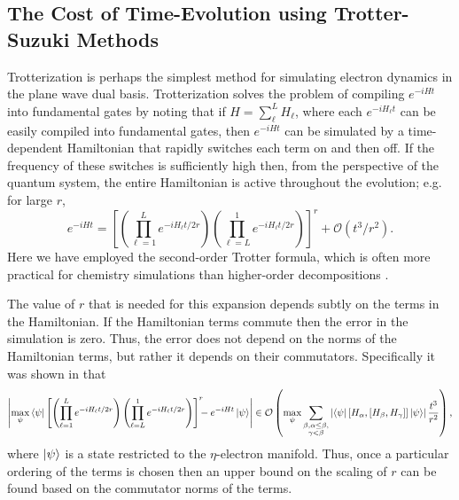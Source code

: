 \documentclass[superscriptaddress,aps,pra,nofootinbib,notitlepage,10pt,longbibliography]{revtex4-1}
\def\bra#1{\mathinner{\langle{#1}|}}
\def\ket#1{\mathinner{|{#1}\rangle}}
\begin{document}
\subsection{The Cost of Time-Evolution using Trotter-Suzuki Methods}
\label{sec:trotter_alg}

Trotterization is perhaps the simplest method for simulating electron dynamics in the plane wave dual basis. Trotterization solves the problem of compiling $e^{-iHt}$ into fundamental gates by noting that if $H=\sum_\ell^L H_\ell$, where each $e^{-iH_\ell t}$ can be easily compiled into fundamental gates, then $e^{-iHt}$ can be simulated by a time-dependent Hamiltonian that rapidly switches each term on and then off.  If the frequency of these switches is sufficiently high then, from the perspective of the quantum system, the entire Hamiltonian is active throughout the evolution; e.g. for large $r$,
\begin{equation}
e^{-iHt}= \left[\left(\prod_{\ell=1}^L e^{-iH_\ell t/2r}\right)\left(\prod_{\ell=L}^1 e^{-iH_\ell t/2r}\right)\right]^r +\mathcal{O}(t^3/r^2).\label{eq:trotdef}
\end{equation}
Here we have employed the second-order Trotter formula, which is often more practical for chemistry simulations than higher-order decompositions \cite{Poulin2014}.

The value of $r$ that is needed for this expansion depends subtly on the terms in the Hamiltonian. If the Hamiltonian terms commute then the error in the simulation is zero.  Thus, the error does not depend on the norms of the Hamiltonian terms, but rather it depends on their commutators.  Specifically it was shown in \cite{Poulin2014} that
\begin{equation}
\left|\max_\psi \bra{\psi} \left[\left(\prod_{\ell=1}^L e^{-iH_\ell t/2r}\right)\left(\prod_{\ell=L}^1 e^{-iH_\ell t/2r}\right)\right]^r  \!\!\! - e^{-iHt}\ket{\psi}\right| \in \mathcal{O}\left( \max_{\psi}\sum_{\substack{\beta,\alpha\le \beta,\\ \gamma <\beta}} \left| \bra{\psi}[H_\alpha,[H_{\beta},H_{\gamma}]]\ket{\psi}\right|\frac{t^3}{r^2}\right),\label{eq:commbound}
\end{equation}
where $\ket{\psi}$ is a state restricted to the $\eta$-electron manifold. Thus, once a particular ordering of the terms is chosen then an upper bound on the scaling of $r$ can be found based on the commutator norms of the terms.
\end{document}

